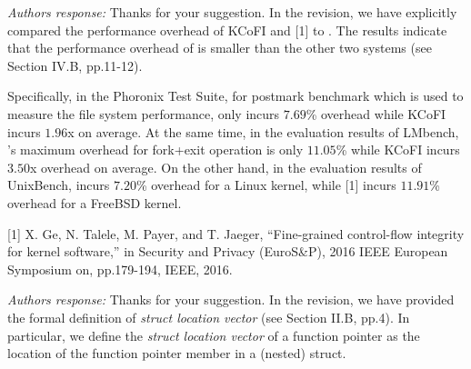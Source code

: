 \documentclass[oneside, 11pt]{article}
\begin{document}


\smallskip
\smallskip
\smallskip
{}

{\em Authors response:}
Thanks for your suggestion. In the revision, we have explicitly compared the
performance overhead of KCoFI and [1] to \TheName{}. The results indicate
that the performance overhead of \TheName{} is smaller than the other two
systems (see Section IV.B, pp.11-12).

Specifically, in the Phoronix Test Suite, for postmark benchmark which is used
to measure the file system performance, \TheName{} only incurs $7.69$\%
overhead while KCoFI incurs $1.96$x on average. At the same time, in the evaluation
results of LMbench, \TheName{}'s maximum overhead for fork+exit operation is
only $11.05$\% while KCoFI incurs $3.50$x overhead on average.
On the other hand, in the evaluation results of UnixBench, \TheName{}
incurs $7.20$\% overhead for a Linux kernel, while [1] incurs $11.91$\% overhead
for a FreeBSD kernel.

[1] X. Ge, N. Talele, M. Payer, and T. Jaeger, ``Fine-grained control-flow
integrity for kernel software,'' in Security and Privacy (EuroS\&P), 2016 IEEE
European Symposium on, pp.179-194, IEEE, 2016.




\smallskip
\smallskip
\smallskip
{}

{\em Authors response:}
Thanks for your suggestion. In the revision, we have provided the formal
definition of \emph{struct location vector} (see Section II.B, pp.4).
In particular, we define the \emph{struct location vector} of a function pointer
as the location of the function pointer member in a (nested) struct.
\end{document}
